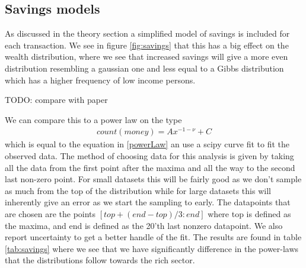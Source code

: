 \documentclass[a4paper,11pt]{article}
\begin{document}
{\subsection{Savings models}
As discussed in the theory section a simplified model of savings is included for each transaction. We see in figure \ref{fig:savings} that this has a big effect on the wealth distribution, where we see that increased savings will give a more even distribution resembling a gaussian one and less equal to a Gibbs distribution which has a higher frequency of low income persons. 

TODO: compare with paper


We can compare this to a power law on the type
\begin{align}
	count (money) = Ax^{-1-\nu} + C
\end{align}
which is equal to the equation in \ref{powerLaw} an use a scipy curve fit to fit the observed data. The method of choosing data for this analysis is given by taking all the data from the first point after the maxima and all the way to the second last non-zero point. For small datasets this will be fairly good as we don't sample as much from the top of the distribution while for large datasets this will inherently give an error as we start the sampling to early. The datapoints that are chosen are the points $[top + (end-top)/3 : end]$ where top is defined as the maxima, and end is defined as the 20'th last nonzero datapoint. We also report uncertainty to get a better handle of the fit. The results are found in table \ref{tab:savings} where we see that we have significantly difference in the power-laws that the distributions follow towards the rich sector. 


}
\end{document}
